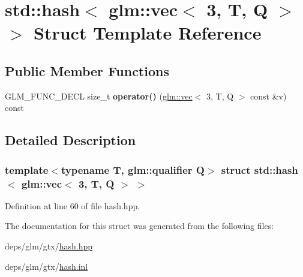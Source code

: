 \hypertarget{structstd_1_1hash_3_01glm_1_1vec_3_013_00_01T_00_01Q_01_4_01_4}{}\section{std\+:\+:hash$<$ glm\+:\+:vec$<$ 3, T, Q $>$ $>$ Struct Template Reference}
\label{structstd_1_1hash_3_01glm_1_1vec_3_013_00_01T_00_01Q_01_4_01_4}
\subsection*{Public Member Functions}
\begin{DoxyCompactItemize}
\item 
\mbox{\label{structstd_1_1hash_3_01glm_1_1vec_3_013_00_01T_00_01Q_01_4_01_4_ab9335d367f5590adefed9757cdeb3ff0}} 
G\+L\+M\+\_\+\+F\+U\+N\+C\+\_\+\+D\+E\+CL size\+\_\+t {\bfseries operator()} (\hyperlink{structglm_1_1vec}{glm\+::vec}$<$ 3, T, Q $>$ const \&v) const
\end{DoxyCompactItemize}


\subsection{Detailed Description}
\subsubsection*{template$<$typename T, glm\+::qualifier Q$>$\newline
struct std\+::hash$<$ glm\+::vec$<$ 3, T, Q $>$ $>$}



Definition at line 60 of file hash.\+hpp.



The documentation for this struct was generated from the following files\+:\begin{DoxyCompactItemize}
\item 
deps/glm/gtx/\hyperlink{hash_8hpp}{hash.\+hpp}\item 
deps/glm/gtx/\hyperlink{hash_8inl}{hash.\+inl}\end{DoxyCompactItemize}
